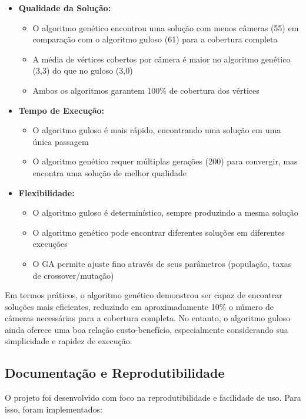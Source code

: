 \documentclass[12pt, a4paper]{report}
\begin{document}
\begin{itemize}
    \item \textbf{Qualidade da Solução:}
    \begin{itemize}
        \item O algoritmo genético encontrou uma solução com menos câmeras (55) em comparação com o algoritmo guloso (61) para a cobertura completa
        \item A média de vértices cobertos por câmera é maior no algoritmo genético (3,3) do que no guloso (3,0)
        \item Ambos os algoritmos garantem 100\% de cobertura dos vértices
    \end{itemize}
    
    \item \textbf{Tempo de Execução:}
    \begin{itemize}
        \item O algoritmo guloso é mais rápido, encontrando uma solução em uma única passagem
        \item O algoritmo genético requer múltiplas gerações (200) para convergir, mas encontra uma solução de melhor qualidade
    \end{itemize}
    
    \item \textbf{Flexibilidade:}
    \begin{itemize}
        \item O algoritmo guloso é determinístico, sempre produzindo a mesma solução
        \item O algoritmo genético pode encontrar diferentes soluções em diferentes execuções
        \item O GA permite ajuste fino através de seus parâmetros (população, taxas de crossover/mutação)
    \end{itemize}
\end{itemize}

Em termos práticos, o algoritmo genético demonstrou ser capaz de encontrar soluções mais eficientes, reduzindo em aproximadamente 10\% o número de câmeras necessárias para a cobertura completa. No entanto, o algoritmo guloso ainda oferece uma boa relação custo-benefício, especialmente considerando sua simplicidade e rapidez de execução.

\subsection{Documentação e Reprodutibilidade}
O projeto foi desenvolvido com foco na reprodutibilidade e facilidade de uso. Para isso, foram implementados:
\end{document}
